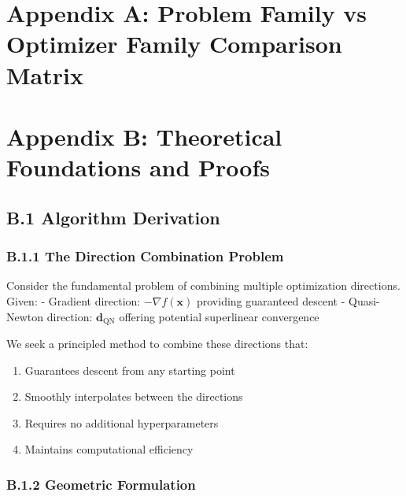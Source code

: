 \hypertarget{appendix-a-problem-family-vs-optimizer-family-comparison-matrix}{%
\section{Appendix A: Problem Family vs Optimizer Family Comparison Matrix}\label{appendix-a-problem-family-vs-optimizer-family-comparison-matrix}}



\hypertarget{appendix-b-theoretical-foundations-and-proofs}{%
\section{Appendix B: Theoretical Foundations and Proofs}\label{appendix-b-theoretical-foundations-and-proofs}}

\hypertarget{b.1-algorithm-derivation}{%
\subsection{B.1 Algorithm Derivation}\label{b.1-algorithm-derivation}}

\hypertarget{b.1.1-the-direction-combination-problem}{%
\subsubsection{B.1.1 The Direction Combination Problem}\label{b.1.1-the-direction-combination-problem}}

Consider the fundamental problem of combining multiple optimization directions. Given:
- Gradient direction: \(-\nabla f(\mathbf{x})\) providing guaranteed descent
- Quasi-Newton direction: \(\mathbf{d}_{\text{QN}}\) offering potential superlinear convergence

We seek a principled method to combine these directions that:

\begin{enumerate}
\def\labelenumi{\arabic{enumi}.}
\tightlist
\item
  Guarantees descent from any starting point
\item
  Smoothly interpolates between the directions
\item
  Requires no additional hyperparameters
\item
  Maintains computational efficiency
\end{enumerate}

\hypertarget{b.1.2-geometric-formulation}{%
\subsubsection{B.1.2 Geometric Formulation}\label{b.1.2-geometric-formulation}}

